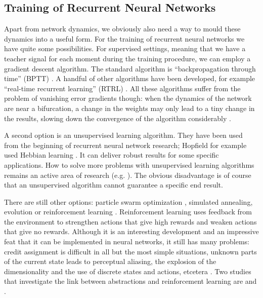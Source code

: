 \documentclass[10pt,a4paper]{report}
\begin{document}
\subsection*{Training of Recurrent Neural Networks}
Apart from network dynamics, we obviously also need a way to mould these dynamics into a useful form. For the training of recurrent neural networks we have quite some possibilities. For supervised settings, meaning that we have a teacher signal for each moment during the training procedure, we can employ a gradient descent algorithm. The standard algorithm is 	``backpropagation through time'' (BPTT) \citep{Werbos1990}. A handful of other algorithms have been developed, for example ``real-time recurrent learning'' (RTRL) \citep{Williams1989}. All these algorithms suffer from the problem of vanishing error gradients though: when the dynamics of the network are near a bifurcation, a change in the weights may only lead to a tiny change in the results, slowing down the convergence of the algorithm considerably \citep{Doya1992}. 

A second option is an unsupervised learning algorithm. They have been used from the beginning of recurrent neural network research; Hopfield for example used Hebbian learning \citep{Hopfield1984}. It can deliver robust results for some specific applications. How to solve more problems with unsupervised learning algorithms remains an active area of research (e.g. \citet{Spratling2012}). The obvious disadvantage is of course that an unsupervised algorithm cannot guarantee a specific end result. 

There are still other options: particle swarm optimization \citep{Gudise2003}, simulated annealing, evolution \citep{Sexton1999} or reinforcement learning \citep{Lin1993}. Reinforcement learning uses feedback from the environment to strengthen actions that give high rewards and weaken actions that give no rewards. Although it is an interesting development and an impressive feat that it can be implemented in neural networks, it still has many problems: credit assignment is difficult in all but the most simple situations, unknown parts of the current state leads to perceptual aliasing, the explosion of the dimensionality and the use of discrete states and actions, etcetera \citep{Vlassis2012}. Two studies that investigate the link between abstractions and reinforcement learning are \citet{Frank2011} and \citet{Botvinick2009}.
\end{document}
